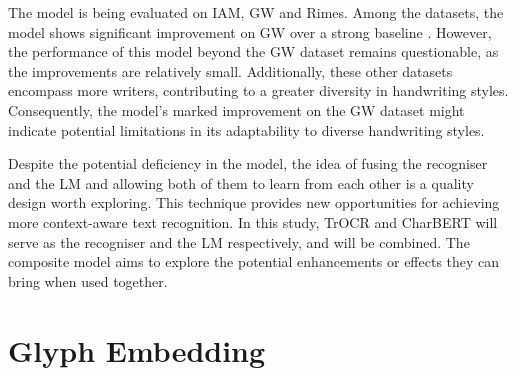 The model is being evaluated on IAM, GW and Rimes. Among the datasets, the model shows significant improvement on GW over a strong baseline \citep{8395102}. However, the performance of this model beyond the GW dataset remains questionable, as the improvements are relatively small. Additionally, these other datasets encompass more writers, contributing to a greater diversity in handwriting styles. Consequently, the model's marked improvement on the GW dataset might indicate potential limitations in its adaptability to diverse handwriting styles.

Despite the potential deficiency in the model, the idea of fusing the recogniser and the LM and allowing both of them to learn from each other is a quality design worth exploring. This technique provides new opportunities for achieving more context-aware text recognition. In this study, TrOCR and CharBERT will serve as the recogniser and the LM respectively, and will be combined. The composite model aims to explore the potential enhancements or effects they can bring when used together.
\section{Glyph Embedding}
\label{sec:2_glyph_embedding}
